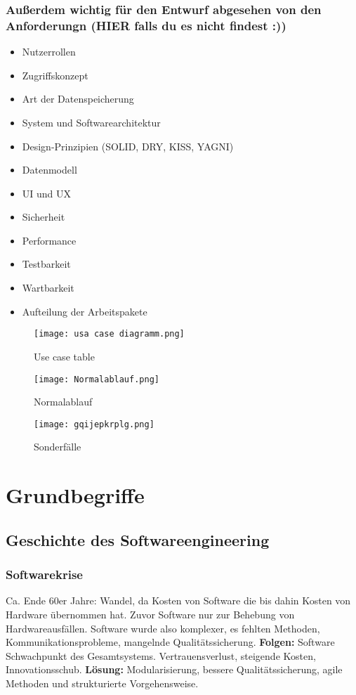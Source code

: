 \documentclass{book}
\begin{document}
    \subsection{\textbf{Außerdem wichtig für den Entwurf abgesehen von den Anforderungn (HIER falls du es nicht findest :))}}
    \begin{itemize}
        \item Nutzerrollen
        \item Zugriffskonzept
        \item Art der Datenspeicherung
        \item System und Softwarearchitektur
        \item Design-Prinzipien (SOLID, DRY, KISS, YAGNI)
        \item Datenmodell
        \item UI und UX
        \item Sicherheit
        \item Performance
        \item Testbarkeit
        \item Wartbarkeit
        \item Aufteilung der Arbeitspakete
    \end{itemize}

    \begin{figure}
        \centering
        \texttt{[image: usa case diagramm.png]}
        \caption{Use case table}
        \label{fig:enter-label}
    \end{figure}
    \begin{figure}
        \centering
        \texttt{[image: Normalablauf.png]}
        \caption{Normalablauf}
        \label{fig:enter-label}
    \end{figure}

    \begin{figure}
        \centering
        \texttt{[image: gqijepkrplg.png]}
        \caption{Sonderfälle}
        \label{fig:enter-label}
    \end{figure}


    \chapter{Grundbegriffe}
    \section{Geschichte des Softwareengineering}
    \subsection{Softwarekrise}
    Ca. Ende 60er Jahre: Wandel, da Kosten von Software die bis dahin Kosten von Hardware übernommen hat. Zuvor Software nur zur Behebung von Hardwareausfällen. Software wurde also komplexer, es fehlten Methoden, Kommunikationsprobleme, mangelnde Qualitätssicherung.
    \textbf{Folgen:} Software Schwachpunkt des Gesamtsystems. Vertrauensverlust, steigende Kosten, Innovationsschub.
    \textbf{Lösung:} Modularisierung, bessere Qualitätssicherung, agile Methoden und strukturierte Vorgehensweise.
\end{document}
